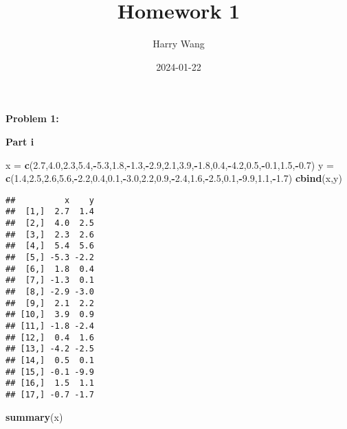 \documentclass[
]{article}
\title{Homework 1}
\author{Harry Wang}
\date{2024-01-22}
\newenvironment{Shaded}{\begin{snugshade}}{\end{snugshade}}
\newcommand{\FloatTok}[1]{\textcolor[rgb]{0.00,0.00,0.81}{#1}}
\newcommand{\FunctionTok}[1]{\textcolor[rgb]{0.13,0.29,0.53}{\textbf{#1}}}
\newcommand{\NormalTok}[1]{#1}
\newcommand{\OtherTok}[1]{\textcolor[rgb]{0.56,0.35,0.01}{#1}}
\newcommand{\SpecialCharTok}[1]{\textcolor[rgb]{0.81,0.36,0.00}{\textbf{#1}}}
\begin{document}
\maketitle

\textbf{Problem 1:}

\textbf{Part i}

\begin{Shaded}
\begin{Highlighting}[]
\NormalTok{x }\OtherTok{=} \FunctionTok{c}\NormalTok{(}\FloatTok{2.7}\NormalTok{,}\FloatTok{4.0}\NormalTok{,}\FloatTok{2.3}\NormalTok{,}\FloatTok{5.4}\NormalTok{,}\SpecialCharTok{{-}}\FloatTok{5.3}\NormalTok{,}\FloatTok{1.8}\NormalTok{,}\SpecialCharTok{{-}}\FloatTok{1.3}\NormalTok{,}\SpecialCharTok{{-}}\FloatTok{2.9}\NormalTok{,}\FloatTok{2.1}\NormalTok{,}\FloatTok{3.9}\NormalTok{,}\SpecialCharTok{{-}}\FloatTok{1.8}\NormalTok{,}\FloatTok{0.4}\NormalTok{,}\SpecialCharTok{{-}}\FloatTok{4.2}\NormalTok{,}\FloatTok{0.5}\NormalTok{,}\SpecialCharTok{{-}}\FloatTok{0.1}\NormalTok{,}\FloatTok{1.5}\NormalTok{,}\SpecialCharTok{{-}}\FloatTok{0.7}\NormalTok{)}
\NormalTok{y }\OtherTok{=} \FunctionTok{c}\NormalTok{(}\FloatTok{1.4}\NormalTok{,}\FloatTok{2.5}\NormalTok{,}\FloatTok{2.6}\NormalTok{,}\FloatTok{5.6}\NormalTok{,}\SpecialCharTok{{-}}\FloatTok{2.2}\NormalTok{,}\FloatTok{0.4}\NormalTok{,}\FloatTok{0.1}\NormalTok{,}\SpecialCharTok{{-}}\FloatTok{3.0}\NormalTok{,}\FloatTok{2.2}\NormalTok{,}\FloatTok{0.9}\NormalTok{,}\SpecialCharTok{{-}}\FloatTok{2.4}\NormalTok{,}\FloatTok{1.6}\NormalTok{,}\SpecialCharTok{{-}}\FloatTok{2.5}\NormalTok{,}\FloatTok{0.1}\NormalTok{,}\SpecialCharTok{{-}}\FloatTok{9.9}\NormalTok{,}\FloatTok{1.1}\NormalTok{,}\SpecialCharTok{{-}}\FloatTok{1.7}\NormalTok{)}
\FunctionTok{cbind}\NormalTok{(x,y)}
\end{Highlighting}
\end{Shaded}

\begin{verbatim}
##          x    y
##  [1,]  2.7  1.4
##  [2,]  4.0  2.5
##  [3,]  2.3  2.6
##  [4,]  5.4  5.6
##  [5,] -5.3 -2.2
##  [6,]  1.8  0.4
##  [7,] -1.3  0.1
##  [8,] -2.9 -3.0
##  [9,]  2.1  2.2
## [10,]  3.9  0.9
## [11,] -1.8 -2.4
## [12,]  0.4  1.6
## [13,] -4.2 -2.5
## [14,]  0.5  0.1
## [15,] -0.1 -9.9
## [16,]  1.5  1.1
## [17,] -0.7 -1.7
\end{verbatim}

\begin{Shaded}
\begin{Highlighting}[]
\FunctionTok{summary}\NormalTok{(x)}
\end{Highlighting}
\end{Shaded}
\end{document}
